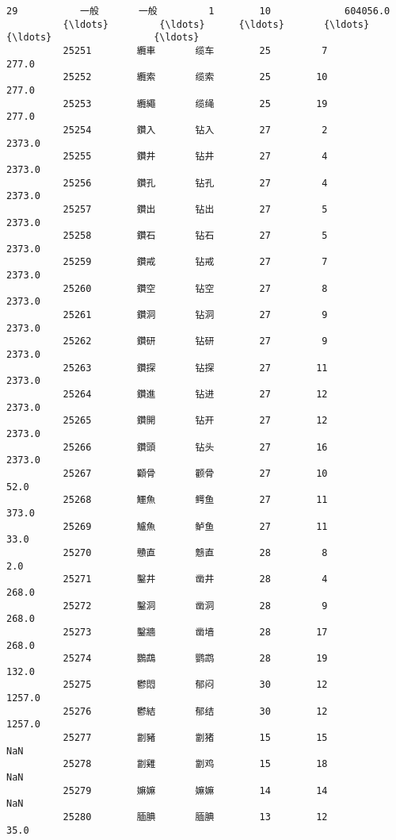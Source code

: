 \documentclass[11pt]{article}
\begin{document}
\begin{Verbatim}[commandchars=\\\{\}]
          29           一般       一般         1        10             604056.0   
          {\ldots}         {\ldots}      {\ldots}       {\ldots}       {\ldots}                  {\ldots}   
          25251        纜車       缆车        25         7                277.0   
          25252        纜索       缆索        25        10                277.0   
          25253        纜繩       缆绳        25        19                277.0   
          25254        鑽入       钻入        27         2               2373.0   
          25255        鑽井       钻井        27         4               2373.0   
          25256        鑽孔       钻孔        27         4               2373.0   
          25257        鑽出       钻出        27         5               2373.0   
          25258        鑽石       钻石        27         5               2373.0   
          25259        鑽戒       钻戒        27         7               2373.0   
          25260        鑽空       钻空        27         8               2373.0   
          25261        鑽洞       钻洞        27         9               2373.0   
          25262        鑽研       钻研        27         9               2373.0   
          25263        鑽探       钻探        27        11               2373.0   
          25264        鑽進       钻进        27        12               2373.0   
          25265        鑽開       钻开        27        12               2373.0   
          25266        鑽頭       钻头        27        16               2373.0   
          25267        顴骨       颧骨        27        10                 52.0   
          25268        鱷魚       鳄鱼        27        11                373.0   
          25269        鱸魚       鲈鱼        27        11                 33.0   
          25270        戇直       戆直        28         8                  2.0   
          25271        鑿井       凿井        28         4                268.0   
          25272        鑿洞       凿洞        28         9                268.0   
          25273        鑿牆       凿墙        28        17                268.0   
          25274        鸚鵡       鹦鹉        28        19                132.0   
          25275        鬱悶       郁闷        30        12               1257.0   
          25276        鬱結       郁结        30        12               1257.0   
          25277        劏豬       劏猪        15        15                  NaN   
          25278        劏雞       劏鸡        15        18                  NaN   
          25279        嫲嫲       嫲嫲        14        14                  NaN   
          25280        腼腆       腼腆        13        12                 35.0   
          

\end{Verbatim}
\end{document}
